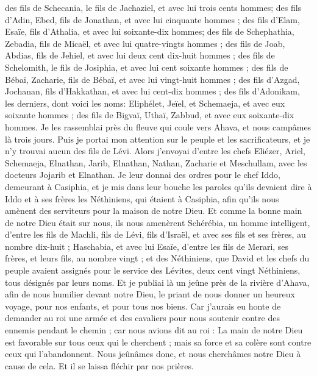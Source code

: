 \begin{multicols}{2}
des fils de Schecania, le fils de Jachaziel, et avec lui trois cents hommes;
des fils d'Adin, Ebed, fils de Jonathan, et avec lui cinquante hommes ;
des fils d'Elam, Esaïe, fils d'Athalia, et avec lui soixante-dix hommes;
des fils de Schephathia, Zebadia, fils de Micaël, et avec lui quatre-vingts hommes ;
des fils de Joab, Abdias, fils de Jehiel, et avec lui deux cent dix-huit hommes ;
des fils de Schelomith, le fils de Josiphia, et avec lui cent soixante hommes ;
des fils de Bébaï, Zacharie, fils de Bébaï, et avec lui vingt-huit hommes ;
des fils d'Azgad, Jochanan, fils d'Hakkathan, et avec lui cent-dix hommes ;
des fils d'Adonikam, les derniers, dont voici les noms: Eliphélet, Jeïel, et Schemaeja, et avec eux soixante hommes ;
des fils de Bigvaï, Uthaï, Zabbud, et avec eux soixante-dix hommes.
Je les rassemblai près du fleuve qui coule vers Ahava, et nous campâmes là trois jours. Puis je portai mon attention sur  le peuple et les sacrificateurs, et je n'y trouvai aucun des fils de Lévi.
Alors j'envoyai d'entre les chefs Eliézer, Ariel, Schemaeja, Elnathan, Jarib, Elnathan, Nathan, Zacharie et Meschullam, avec les docteurs Jojarib et Elnathan.
Je leur donnai des ordres pour le chef Iddo, demeurant à Casiphia, et je mis dans leur bouche les paroles qu'ils devaient dire à Iddo et à ses frères les Néthiniens, qui étaient à Casiphia, afin qu'ils nous amènent des serviteurs pour la maison de notre Dieu.
Et comme la bonne main de notre Dieu était sur nous, ils nous amenèrent Schérébia, un homme intelligent, d'entre les fils de Machli, fils de Lévi, fils d'Israël, et avec ses fils et ses frères, au nombre dix-huit ;
Haschabia, et avec lui Esaïe, d'entre les fils de Merari, ses frères, et leurs fils, au nombre vingt ;
et des Néthiniens, que David et les chefs du peuple avaient assignés pour le service des Lévites, deux cent vingt Néthiniens, tous désignés par leurs noms.
Et je publiai là un jeûne près de la rivière d'Ahava, afin de nous humilier devant notre Dieu, le priant de nous donner un heureux voyage, pour nos enfants, et pour tous nos biens.
Car j'aurais eu honte de demander au roi une armée et des cavaliers pour nous soutenir contre des ennemis pendant le chemin ; car nous avions dit au roi : La main de notre Dieu est favorable sur tous ceux qui le cherchent ; mais sa force et sa colère sont contre ceux qui l'abandonnent.
Nous jeûnâmes donc, et nous cherchâmes notre Dieu à cause de cela. Et il se laissa fléchir par nos prières.

\end{multicols}
